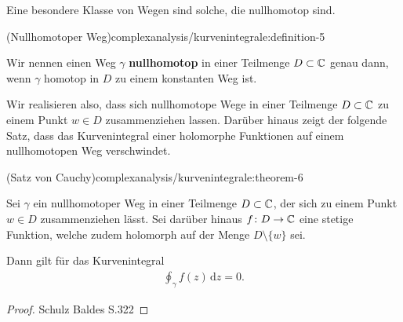\par
Eine besondere Klasse von Wegen sind solche, die nullhomotop sind.
\begin{definition}{(Nullhomotoper Weg)}{complexanalysis/kurvenintegrale:definition-5}



\par
Wir nennen einen Weg \(\gamma\) \textbf{nullhomotop} in einer Teilmenge \(D \subset \mathbb{C}\) genau dann, wenn \(\gamma\) homotop in \(D\) zu einem konstanten Weg ist.
\end{definition}

\par
Wir realisieren also, dass sich nullhomotope Wege in einer Teilmenge \(D \subset \mathbb{C}\) zu einem Punkt \(w \in D\) zusammenziehen lassen.
Darüber hinaus zeigt der folgende Satz, dass das Kurvenintegral einer holomorphe Funktionen auf einem nullhomotopen Weg verschwindet.
\begin{theorem}{(Satz von Cauchy)}{complexanalysis/kurvenintegrale:theorem-6}



\par
Sei \(\gamma\) ein nullhomotoper Weg in einer Teilmenge \(D \subset \mathbb{C}\), der sich zu einem Punkt \(w \in D\) zusammenziehen lässt.
Sei darüber hinaus \(f \colon D \rightarrow \mathbb{C}\) eine stetige Funktion, welche zudem holomorph auf der Menge \(D \setminus \{w\}\) sei.

\par
Dann gilt für das Kurvenintegral
\begin{align*}
\oint_\gamma f(z) \, \mathrm{d}z = 0.
\end{align*}\end{theorem}

\begin{proof}
 Schulz Baldes S.322
\end{proof}


